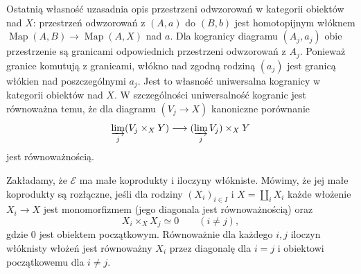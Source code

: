 Ostatnią własność uzasadnia opis przestrzeni odwzorowań w kategorii obiektów nad $X$: przestrzeń odwzorowań z $(A,a)$ do $(B,b)$ jest homotopijnym włóknem $\operatorname{Map}(A,B)\to\operatorname{Map}(A,X)$ nad $a$. Dla kogranicy diagramu $(A_j,a_j)$ obie przestrzenie są granicami odpowiednich przestrzeni odwzorowań z $A_j$. Ponieważ granice komutują z granicami, włókno nad zgodną rodziną $(a_j)$ jest granicą włókien nad poszczególnymi $a_j$. Jest to własność uniwersalna kogranicy w kategorii obiektów nad $X$. W szczególności uniwersalność kogranic jest równoważna temu, że dla diagramu $(V_j\to X)$ kanoniczne porównanie
\[
 \varinjlim_j(V_j\times_XY)\longrightarrow
 (\varinjlim_j V_j)\times_X Y
\]
jest równoważnością.

\begin{definicja}\label{cat:def:infty-topos-disjoint-coproducts}
Zakładamy, że $\mathcal E$ ma małe koprodukty i iloczyny włókniste. Mówimy, że jej małe koprodukty są rozłączne, jeśli dla rodziny $(X_i)_{i\in I}$ i $X=\coprod_i X_i$ każde włożenie $X_i\to X$ jest monomorfizmem (jego diagonala jest równoważnością) oraz
\[
 X_i\times_X X_j\simeq 0\qquad(i\neq j),
\]
gdzie $0$ jest obiektem początkowym. Równoważnie dla każdego $i,j$ iloczyn włóknisty włożeń jest równoważny $X_i$ przez diagonalę dla $i=j$ i obiektowi początkowemu dla $i\neq j$.
\end{definicja}

